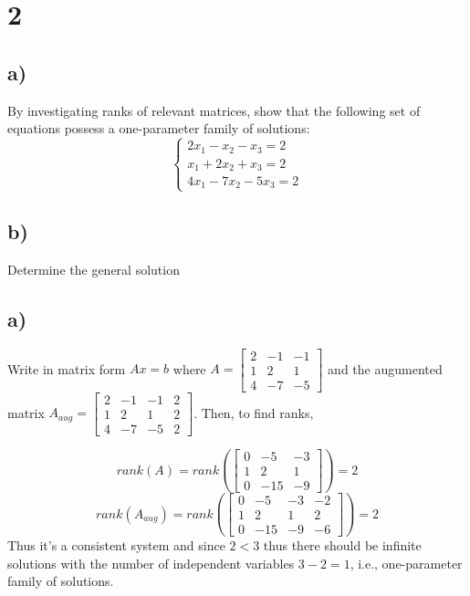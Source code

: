 \documentclass{article}
\begin{document}
\section*{2}

\begin{myleftlinebox}
    \subsection*{a)} By investigating ranks of relevant matrices, show that the following set of equations possess a one-parameter family of solutions:
    \[
        \begin{cases}
            2x_1 -x_2 -x_3 =2\\
            x_1 +2x_2 +x_3 =2\\
            4x_1 -7x_2 -5x_3 =2
        \end{cases}
    \]
    \subsection*{b)} Determine the general solution
    \tcblower
    \subsection*{a)}
    Write in matrix form \(Ax=b\) where \(A = \begin{bmatrix}
        2 & -1 & -1\\
        1 & 2 & 1\\
        4 & -7 & -5
    \end{bmatrix}\) and the augumented matrix \(A_{aug} = \begin{bmatrix}
        2 & -1 & -1 & 2\\
        1 & 2 & 1 & 2\\
        4 & -7 & -5 & 2
    \end{bmatrix}\).
    Then, to find ranks,

    \begin{equation*}
        rank(A) = rank(\begin{bmatrix}
            0 & -5 & -3 \\
            1 & 2 & 1 \\
            0 & -15 & -9
        \end{bmatrix}) = 2 
    \end{equation*}
    \begin{equation*}
        rank(A_{aug}) = rank(\begin{bmatrix}
            0 & -5 & -3 & -2\\
            1 & 2 & 1 & 2\\
            0 & -15 & -9 & -6
        \end{bmatrix}) = 2
    \end{equation*}
    Thus it's a consistent system and since \(2<3\) thus there should be infinite solutions with the number of independent variables \(3-2=1\), i.e., one-parameter family of solutions.

\end{myleftlinebox}
\end{document}
